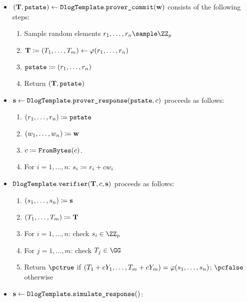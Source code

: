 \documentclass[11pt]{article}
\begin{document}
\begin{itemize}
  \item\label{item:basic:p1}
   $(\mathbf {T}, \texttt{pstate}) \gets \texttt{DlogTemplate}.\texttt{prover\_commit}(\mathbf {w})$ consists of the following steps:
    \begin{enumerate}
      \item\label{item:basic:p1:randomness}
        Sample random elements $r_1,\dots,r_n\sample\ZZ_p$
      \item
         $\mathbf {T} \coloneqq (T_1,\dots,T_m)\gets\varphi(r_1,\dots,r_n)$
      \item $\texttt{pstate}\coloneqq (r_1,\dots,r_n)$
      \item
        Return $(\mathbf {T},\texttt{pstate})$
    \end{enumerate}
  \item\label{item:basic:p2}
    $\mathbf {s} \gets \texttt{DlogTemplate}.\texttt{prover\_response}(\texttt{pstate},c)$ proceeds as follows:
    \begin{enumerate}
      \item  $(r_1,\dots,r_n)\coloneqq \texttt{pstate}$
      \item  $(w_1,\dots,w_n)\coloneqq \mathbf {w}$
      \item
        $c \coloneqq \texttt{FromBytes}(c)$.
      \item For $i=1,\dots,n$: $s_i\coloneqq r_i+cw_i$
    \end{enumerate}
  \item\label{item:basic:v}
     $\texttt{DlogTemplate}.\texttt{verifier}(\mathbf {T},c,\mathbf {s})$ proceeds as follows:
    \begin{enumerate}
      \item  $(s_1, \dots, s_n) \coloneqq \mathbf {s}$
      \item $(T_1, \dots, T_m) \coloneqq \mathbf {T}$
      \item\label{item:basic:v:checks}
      For $i=1,\dots,n$: check $\response_i\in\ZZ_p$
      \item
      For $j=1,\dots,m$: check $\commitment_j\in\GG$
      \item Return $\accept$ if $(T_1 + cY_1,\dots,T_m + cY_m) = \varphi(s_1,\dots,s_n)$; $\reject$ otherwise
    \end{enumerate}
  \item $\mathbf {s} \gets \texttt{DlogTemplate}.\texttt{simulate\_response}()$:
  \begin{enumerate}

\end{enumerate}
\end{itemize}
\end{document}
